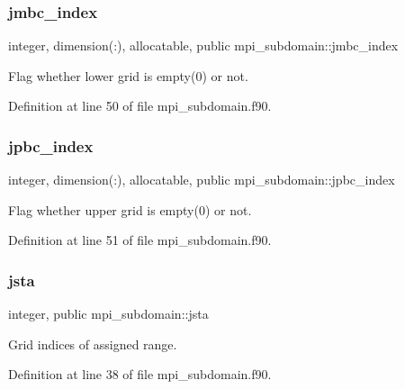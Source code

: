 \subsubsection{\texorpdfstring{jmbc\_index}{jmbc\_index}}
{\footnotesize\ttfamily integer, dimension(\+:), allocatable, public mpi\+\_\+subdomain\+::jmbc\+\_\+index}



Flag whether lower grid is empty(0) or not. 



Definition at line 50 of file mpi\+\_\+subdomain.\+f90.

\mbox{\label{namespacempi__subdomain_a9adbfdd11c7e9fdb968bb8eef2b13c2b}} 
\subsubsection{\texorpdfstring{jpbc\_index}{jpbc\_index}}
{\footnotesize\ttfamily integer, dimension(\+:), allocatable, public mpi\+\_\+subdomain\+::jpbc\+\_\+index}



Flag whether upper grid is empty(0) or not. 



Definition at line 51 of file mpi\+\_\+subdomain.\+f90.

\mbox{\label{namespacempi__subdomain_ac85bfba1caf77f9c3c0047fe9450fee6}} 
\subsubsection{\texorpdfstring{jsta}{jsta}}
{\footnotesize\ttfamily integer, public mpi\+\_\+subdomain\+::jsta}



Grid indices of assigned range. 



Definition at line 38 of file mpi\+\_\+subdomain.\+f90.

\mbox{\label{namespacempi__subdomain_af9934313b1ccbcb09f30916df3326076}} 
